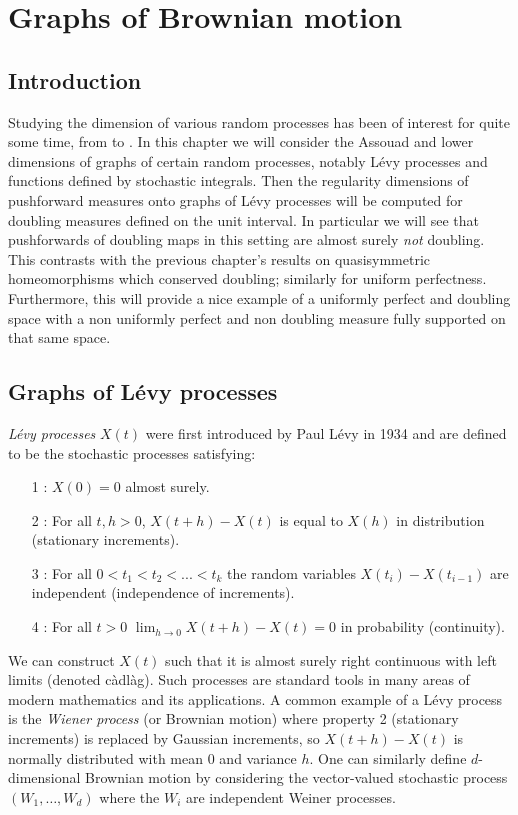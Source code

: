 \chapter{Graphs of Brownian motion}
\label{chap:graphs}

\section{Introduction}
\label{sec:intro-brownian}


Studying the dimension of various random processes has been of interest for quite some time, from \cite{taylor} to \cite{falconer-levy}. In this chapter we will consider the Assouad and lower dimensions of graphs of certain random processes, notably L\'evy processes and functions defined by stochastic integrals. Then the regularity dimensions of pushforward measures onto graphs of L\'evy processes will be computed for doubling measures defined on the unit interval. In particular we will see that pushforwards of doubling maps in this setting are almost surely \textit{not} doubling. This contrasts with the previous chapter's results on quasisymmetric homeomorphisms which conserved doubling; similarly for uniform perfectness. Furthermore, this will provide a nice example of a uniformly perfect and doubling space with a non uniformly perfect and non doubling measure fully supported on that same space.


\section{Graphs of L\'evy processes}
\label{sec:levy-process}


\emph{L\'{e}vy processes} $X(t)$ were first introduced by Paul L\'evy in 1934 \cite{levy} and are defined to be the stochastic processes satisfying:
\begin{itemize}
	\item[1]: $X(0)=0$ almost surely.
	\item[2]: For all $t,h>0$, $X(t+h)-X(t)$ is equal to $X(h)$ in distribution (stationary increments).
	\item[3]: For all $0<t_1<t_2<...<t_k$ the random variables $X(t_i)-X(t_{i-1})$ are independent (independence of increments).
	\item[4]: For all $t>0$ $\lim_{h\to 0} X(t+h)-X(t)=0$ in probability (continuity).
\end{itemize}

We can construct $X(t)$ such that it is almost surely right continuous with left limits (denoted c\`adl\`ag). Such processes are standard tools in many areas of modern mathematics and its applications. A common example of a L\'evy process is the \emph{Wiener process} (or Brownian motion) where property 2 (stationary increments) is replaced by Gaussian increments, so $X(t+h)-X(t)$ is normally distributed with mean 0 and variance $h$. One can similarly define $d$-dimensional Brownian motion by considering the vector-valued stochastic process $(W_1,\ldots, W_d)$ where the $W_i$ are independent Weiner processes. 


